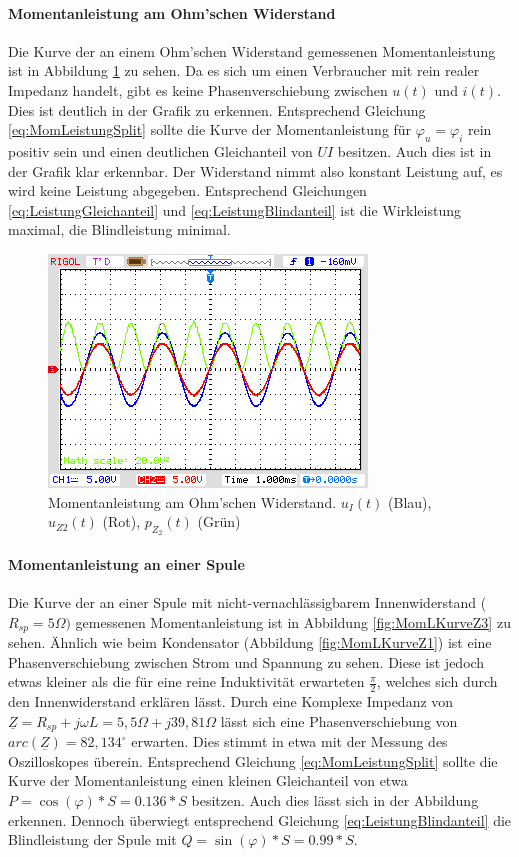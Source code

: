 \paragraph{Momentanleistung am Ohm'schen Widerstand}
Die Kurve der an einem Ohm'schen Widerstand gemessenen Momentanleistung ist in Abbildung \ref{fig:MomLKurveZ2} zu sehen. Da es sich um einen Verbraucher mit rein realer Impedanz handelt, gibt es keine Phasenverschiebung zwischen $u(t)$ und $i(t)$. Dies ist deutlich in der Grafik zu erkennen. Entsprechend Gleichung \eqref{eq:MomLeistungSplit} sollte die Kurve der Momentanleistung für $\varphi_u = \varphi_i$ rein positiv sein und einen deutlichen Gleichanteil von $UI$ besitzen. Auch dies ist in der Grafik klar erkennbar. Der Widerstand nimmt also konstant Leistung auf, es wird keine Leistung abgegeben. Entsprechend Gleichungen \eqref{eq:LeistungGleichanteil} und \eqref{eq:LeistungBlindanteil} ist die Wirkleistung maximal, die Blindleistung minimal.


\begin{figure}[H]
\centering
\includegraphics[width=0.7\linewidth]{Oszi-Bitmaps/NewFile1.jpg}
\caption{Momentanleistung am Ohm'schen Widerstand. $u_I(t)$ (Blau), $u_{Z2}(t)$ (Rot), $p_{Z_2}(t)$ (Grün)}
\label{fig:MomLKurveZ2}
\end{figure}

\paragraph{Momentanleistung an einer Spule}
Die Kurve der an einer Spule mit nicht-vernachlässigbarem Innenwiderstand ($R_{sp} = 5\Omega)$ gemessenen Momentanleistung ist in Abbildung \ref{fig:MomLKurveZ3} zu sehen. Ähnlich wie beim Kondensator (Abbildung \ref{fig:MomLKurveZ1}) ist eine Phasenverschiebung zwischen Strom und Spannung zu sehen. Diese ist jedoch etwas kleiner als die für eine reine Induktivität erwarteten $\frac{\pi}{2}$, welches sich durch den Innenwiderstand erklären lässt. Durch eine Komplexe Impedanz von $\underline{Z} = R_{sp} + j\omega L = 5,5\Omega + j39,81\Omega$ lässt sich eine Phasenverschiebung von $arc(\underline{Z}) = 82,134^\circ$ erwarten. Dies stimmt in etwa mit der Messung des Oszilloskopes überein. Entsprechend Gleichung \eqref{eq:MomLeistungSplit} sollte die Kurve der Momentanleistung einen kleinen Gleichanteil von etwa $P = \cos(\varphi)*S=0.136*S$ besitzen. Auch dies lässt sich in der Abbildung erkennen. Dennoch überwiegt entsprechend Gleichung \eqref{eq:LeistungBlindanteil} die Blindleistung der Spule mit $Q=\sin(\varphi)*S=0.99*S$.

